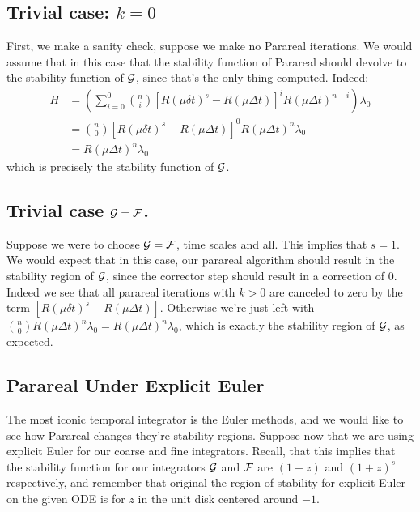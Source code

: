 \subsection{Trivial case: $k = 0$}

First, we make a sanity check, suppose we make no Parareal iterations. We would
assume that in this case that the stability function of Parareal should devolve
to the stability function of $\mathcal{G}$, since that's the only thing computed.
Indeed:
\begin{align*}
  H & = \left( \sum_{i=0}^0 \binom{n}{i} \left[ R(\mu \delta t)^s -
    R(\mu \Delta t) \right]^i R(\mu \Delta t)^{n-i} \right) \lambda_0 \\
  & = \binom{n}{0} \left[ R(\mu \delta t)^s - R(\mu \Delta t) \right]^0 R(\mu
  \Delta t)^{n} \lambda_0 \\
  & = R(\mu \Delta t)^{n} \lambda_0
\end{align*}
which is precisely the stability function of $\mathcal{G}$.

\subsection{Trivial case $\mathcal{G} = \mathcal{F}$.}

Suppose we were to choose $\mathcal{G} = \mathcal{F}$, time scales and all. This implies
that $s = 1$. We would expect that in this case, our parareal algorithm should
result in the stability region of $\mathcal{G}$, since the corrector step should
result in a correction of $0$. Indeed we see that all parareal iterations with
$k > 0$ are canceled to zero by the term $[R(\mu \delta t)^s - R(\mu \Delta
t)]$. Otherwise we're just left with $\binom{n}{0} R(\mu \Delta t)^n \lambda_0 =
R(\mu \Delta t)^n \lambda_0$, which is exactly the stability region of
$\mathcal{G}$, as expected.

\subsection{Parareal Under Explicit Euler}

The most iconic temporal integrator is the Euler methods, and we would like to
see how Parareal changes they're stability regions.  Suppose now that we are
using explicit Euler for our coarse and fine integrators.  Recall, that this
implies that the stability function for our integrators $\mathcal{G}$ and $\mathcal{F}$
are $(1+z)$ and $(1+z)^s$ respectively, and remember that original the
region of stability for explicit Euler on the given ODE is for $z$ in the unit
disk centered around $-1$. 

